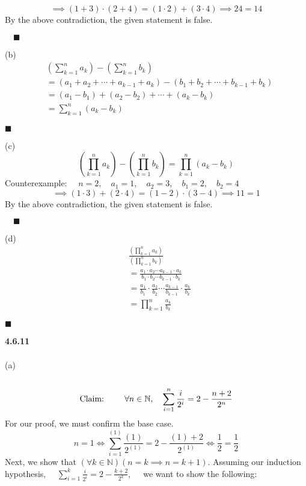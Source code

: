 \documentclass[12pt]{article}
\begin{document}
$$\implies (1+3)\cdot (2+4) = (1\cdot 2)+(3\cdot 4) \implies 24=14$$
By the above contradiction, the given statement is false. 
\begin{flushright}
$\quad\blacksquare$
\end{flushright}
(b)
\begin{align}
&\left(\sum_{k=1}^{n}a_k\right)-\left(\sum_{k=1}^{n}b_k\right)\\
&= (a_1+a_2+\cdots+a_{k-1}+a_k)-(b_1+b_2+\cdots+b_{k-1}+b_k)\\
&= (a_1-b_1)+(a_2-b_2)+\cdots+(a_k-b_k)\\
&= \sum_{k=1}^{n}(a_k-b_k)
\end{align}
\begin{flushright}
$\blacksquare$
\end{flushright}
(c)\\
$$\left(\prod_{k=1}^{n}a_k\right)-\left(\prod_{k=1}^{n}b_k\right)=\prod_{k=1}^{n}(a_k - b_k)$$
Counterexample: $\quad  n=2, \quad a_1 = 1, \quad a_2 = 3, \quad b_1=2, \quad b_2=4$
$$\implies (1\cdot 3)+ (2\cdot 4) = (1- 2)\cdot (3- 4) \implies 11=1$$
By the above contradiction, the given statement is false. 
\begin{flushright}
$\quad\blacksquare$
\end{flushright}
(d)\\
\begin{align}
&\frac{\left(\prod_{k=1}^{n}a_k\right)}{\left(\prod_{k=1}^{n}b_k\right)}\\
&= \frac{a_1\cdot a_2 \cdots a_{k-1}\cdot a_k}{b_1\cdot b_2 \cdots b_{k-1}\cdot b_k}\\
&= \frac{a_1}{b_1}\cdot\frac{a_2}{b_2}\cdots \frac{a_{k-1}}{b_{k-1}}\cdot \frac{a_k}{b_k}\\
&= \prod_{k=1}^{n}\frac{a_k}{b_k}
\end{align}
\begin{flushright}
$\blacksquare$
\end{flushright}
\textbf{4.6.11}\\\\
(a)\\\\
$$\textnormal{Claim: }\quad\quad\forall n \in \mathbb{N}, \quad \sum_{i=1}^{n}\frac{i}{2^i}=2-\frac{n+2}{2^n}$$
For our proof, we must confirm the base case. $$n=1 \iff \sum_{i=1}^{(1)}\frac{(1)}{2^{(1)}}=2-\frac{(1)+2}{2^{(1)}}\iff \frac{1}{2}=\frac{1}{2}$$
Next, we show that $(\forall k \in \mathbb{N})(n=k \implies n=k+1)$. Assuming our induction hypothesis, $\quad \sum_{i=1}^{k}\frac{i}{2^i}=2-\frac{k+2}{2^k},\quad$ we want to show the following:
\end{document}
